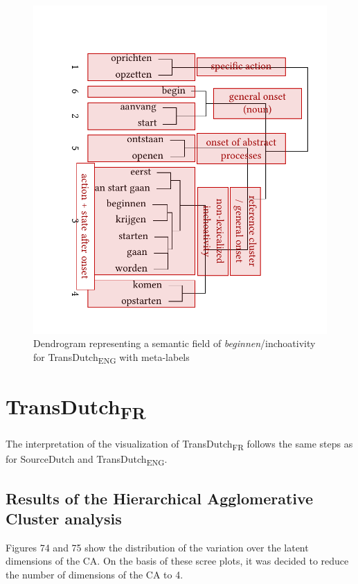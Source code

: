 \begin{figure}
\includegraphics[width=\textwidth]{figures/tree75.pdf}
\caption{\label{fig:4:73}  Dendrogram representing a semantic field of \textit{beginnen}/inchoativity for TransDutch\textsubscript{ENG} with meta-labels}
\end{figure}

\section{TransDutch\textsubscript{FR}}
\label{sec:4.4}  
The interpretation of the visualization of TransDutch\textsubscript{FR} follows the same steps as for SourceDutch and TransDutch\textsubscript{ENG}.

\subsection{Results of the Hierarchical Agglomerative Cluster analysis}
\label{sec:4.4.1}  
Figures 74 and 75 show the distribution of the variation over the latent dimensions of the CA. On the basis of these scree plots, it was decided to reduce the number of dimensions of the CA to 4.

